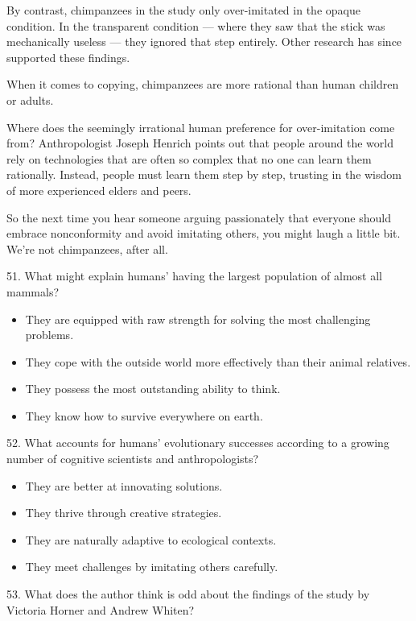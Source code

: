 \documentclass[UTF8,11pt]{ctexart}
\begin{document}
By contrast, chimpanzees in the study only over-imitated in the opaque condition. In the transparent condition — where they saw that the stick was mechanically useless — they ignored that step entirely. Other research has since supported these findings.


When it comes to copying, chimpanzees are more rational than human children or adults.


Where does the seemingly irrational human preference for over-imitation come from? Anthropologist Joseph Henrich points out that people around the world rely on technologies that are often so complex that no one can learn them rationally. Instead, people must learn them step by step, trusting in the wisdom of more experienced elders and peers.


So the next time you hear someone arguing passionately that everyone should embrace nonconformity and avoid imitating others, you might laugh a little bit. We’re not chimpanzees, after all.


51. What might explain humans’ having the largest population of almost all mammals?


\begin{itemize}[leftmargin=2em,itemsep=.2em,topsep=.4em]\item[A.] They are equipped with raw strength for solving the most challenging problems.
\item[B.] They cope with the outside world more effectively than their animal relatives.
\item[C.] They possess the most outstanding ability to think.
\item[D.] They know how to survive everywhere on earth.
\end{itemize}

52. What accounts for humans’ evolutionary successes according to a growing number of cognitive scientists and anthropologists?


\begin{itemize}[leftmargin=2em,itemsep=.2em,topsep=.4em]\item[A.] They are better at innovating solutions.
\item[B.] They thrive through creative strategies.
\item[C.] They are naturally adaptive to ecological contexts.
\item[D.] They meet challenges by imitating others carefully.
\end{itemize}

53. What does the author think is odd about the findings of the study by Victoria Horner and Andrew Whiten?
\end{document}
